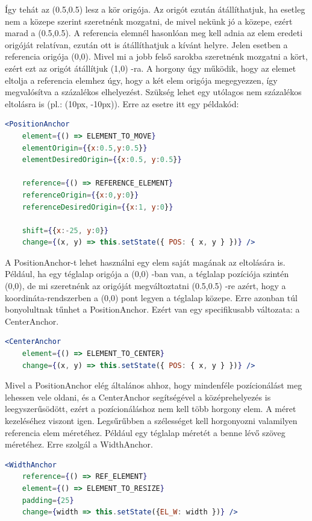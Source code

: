 \documentclass[a4paper,12pt,oneside]{report}
\begin{document}
\begin{justify}
	Így tehát az (0.5,0.5) lesz a kör origója. Az origót ezután átállíthatjuk, ha esetleg nem a közepe szerint szeretnénk mozgatni, de mivel nekünk jó a közepe, ezért marad a (0.5,0.5). A referencia elemnél hasonlóan meg kell adnia az elem eredeti origóját relatívan, ezután ott is átállíthatjuk a kívánt helyre. Jelen esetben a referencia origója (0,0). Mivel mi a jobb felső sarokba szeretnénk mozgatni a kört, ezért ezt az origót átállítjuk (1,0) -ra. A horgony úgy működik, hogy az elemet eltolja a referencia elemhez úgy, hogy a két elem origója megegyezzen, így megvalósítva a százalékos elhelyezést. Szükség lehet egy utólagos nem százalékos eltolásra is (pl.: (10px, -10px)). Erre az esetre itt egy példakód:

	\begin{lstlisting}[language=jsx]
	<PositionAnchor 
	element={() => ELEMENT_TO_MOVE}
	elementOrigin={{x:0.5,y:0.5}}
	elementDesiredOrigin={{x:0.5, y:0.5}}

	reference={() => REFERENCE_ELEMENT}
	referenceOrigin={{x:0,y:0}}
	referenceDesiredOrigin={{x:1, y:0}}

	shift={{x:-25, y:0}}
	change={(x, y) => this.setState({ POS: { x, y } })} />
	\end{lstlisting}

	A PositionAnchor-t lehet használni egy elem saját magának az eltolására is. Például, ha egy téglalap origója a (0,0) -ban van, a téglalap pozíciója szintén (0,0), de mi szeretnénk az origóját megváltoztatni (0.5,0.5) -re azért, hogy a koordináta-rendszerben a (0,0) pont legyen a téglalap közepe. Erre azonban túl bonyolultnak tűnhet a PositionAnchor. Ezért van egy specifikusabb változata: a CenterAnchor.

	\begin{lstlisting}[language=jsx]
	<CenterAnchor
	element={() => ELEMENT_TO_CENTER}
	change={(x, y) => this.setState({ POS: { x, y } })} />
	\end{lstlisting}

	Mivel a PositionAnchor elég általános ahhoz, hogy mindenféle pozícionálást meg lehessen vele oldani, és a CenterAnchor segítségével a középrehelyezés is leegyszerűsödött, ezért a pozícionáláshoz nem kell több horgony elem. A méret kezeléséhez viszont igen. Legsűrűbben a szélességet kell horgonyozni valamilyen referencia elem méretéhez. Például egy téglalap méretét a benne lévő szöveg méretéhez. Erre szolgál a WidthAnchor.

	\begin{lstlisting}[language=jsx]
	<WidthAnchor
	reference={() => REF_ELEMENT}
	element={() => ELEMENT_TO_RESIZE}
	padding={25}
	change={width => this.setState({EL_W: width })} />
	\end{lstlisting}


\end{justify}
\end{document}
